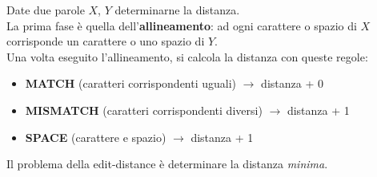 \begin{example}
	
\end{example}

\begin{example}
	Date due parole $X$, $Y$ determinarne la distanza.\\
	La prima fase è quella dell'\textbf{allineamento}: ad ogni carattere o spazio di $X$ corrisponde un carattere o uno spazio di $Y$.\\
	Una volta eseguito l'allineamento, si calcola la distanza con queste regole:
	\begin{itemize}
		\item \textbf{MATCH} (caratteri corrispondenti uguali) $\rightarrow$ distanza + 0
		\item \textbf{MISMATCH} (caratteri corrispondenti diversi) $\rightarrow$ distanza + 1
		\item \textbf{SPACE} (carattere e spazio) $\rightarrow$ distanza + 1
	\end{itemize}
	Il problema della edit-distance è determinare la distanza \emph{minima}.
\end{example}